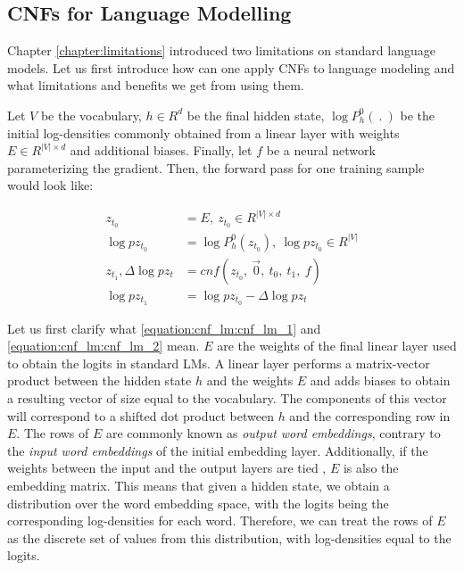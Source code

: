 \subsection{CNFs for Language Modelling}

Chapter \ref{chapter:limitations} introduced two limitations on standard language models. Let us first introduce how can one apply CNFs to language modeling and what limitations and benefits we get from using them.

Let $ V $ be the vocabulary, $ h \in R^d $ be the final hidden state, $ \log P_h^0(\ . \ ) $ be the initial log-densities commonly obtained from a linear layer with weights $ E \in R^{|V| \times d} $ and additional biases. Finally, let $ f $ be a neural network parameterizing the gradient. Then, the forward pass for one training sample would look like:


\begin{align}
    \label{equation:cnf_lm:cnf_lm_1}
    z_{t_0} &= E , \ z_{t_0} \in R^{|V| \times d} \\
    \label{equation:cnf_lm:cnf_lm_2}
    \log pz_{t_0} &= \log P_h^0(z_{t_0}), \ \log pz_{t_0} \in R^{|V|} \\
    \label{equation:cnf_lm:cnf_lm_3}
    z_{t_1}, \Delta \log pz_t &= cnf(z_{t_0}, \ \vec{0}, \ t_0 , \ t_1 , \ f) \\
    \label{equation:cnf_lm:cnf_lm_4}
    \log pz_{t_1} &= \log pz_{t_0} -  \Delta \log  pz_t
\end{align}

Let us first clarify what \ref{equation:cnf_lm:cnf_lm_1} and \ref{equation:cnf_lm:cnf_lm_2} mean. $ E $ are the weights of the final linear layer used to obtain the logits in standard LMs. A linear layer performs a matrix-vector product between the hidden state $ h $ and the weights $ E $ and adds biases to obtain a resulting vector of size equal to the vocabulary. The components of this vector will correspond to a shifted dot product between $ h $ and the corresponding row in $ E $. The rows of $ E $ are commonly known as \emph{output word embeddings}, contrary to the \emph{input word embeddings} of the initial embedding layer. Additionally, if the weights between the input and the output layers are tied \citep{inan2016tying}, $ E $ is also the embedding matrix. This means that given a hidden state, we obtain a distribution over the word embedding space, with the logits being the corresponding log-densities for each word. Therefore, we can treat the rows of $ E $ as the discrete set of values from this distribution, with log-densities equal to the logits.

